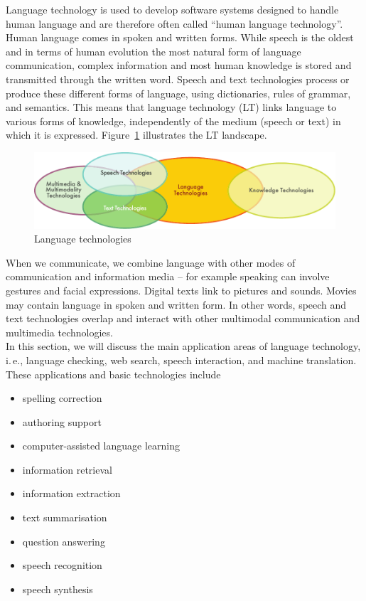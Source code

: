 \begin{multicols}{2}

Language technology is used to develop software systems designed to handle human language and are therefore often called ``human language technology''. Human language comes in spoken and written forms. While speech is the oldest and in terms of human evolution the most natural form of language communication, complex information and most human knowledge is stored and transmitted through the written word. Speech and text technologies process or produce these different forms of language, using dictionaries, rules of grammar, and semantics. This means that language technology (LT) links language to various forms of knowledge, independently of the medium (speech or text) in which it is expressed. Figure~\ref{fig:ltincontext_en} illustrates the LT landscape.

\begin{figure}[htb]
  \center
  \includegraphics[width=\textwidth]{../_media/english/language_technologies}
  \caption{Language technologies}
  \label{fig:ltincontext_en}
  \vspace{-15mm}
\end{figure}

When we communicate, we combine language with other modes of communication and information media -- for example speaking can involve gestures and facial expressions. Digital texts link to pictures and sounds. Movies may contain language in spoken and written form. In other words, speech and text technologies overlap and interact with other multimodal communication and multimedia technologies.\\ 
In this section, we will discuss the main application areas of language technology, i.\,e., language checking, web search, speech interaction, and machine translation. These applications and basic technologies include 

\begin{itemize}
\item spelling correction
\item authoring support
\item computer-assisted language learning
\item information retrieval 
\item information extraction
\item text summarisation
\item question answering
\item speech recognition 
\item speech synthesis 
\end{itemize}


\end{multicols}
